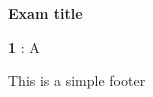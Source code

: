 \documentclass{article}
\begin{document}
    \begin{center}
    \textbf { {\Large Exam title } }
    \end{center}

    \begin{multicols}{5}
        
        \textbf{ 1 }: A
        
    \end{multicols}

    This is a simple footer
\end{document}
